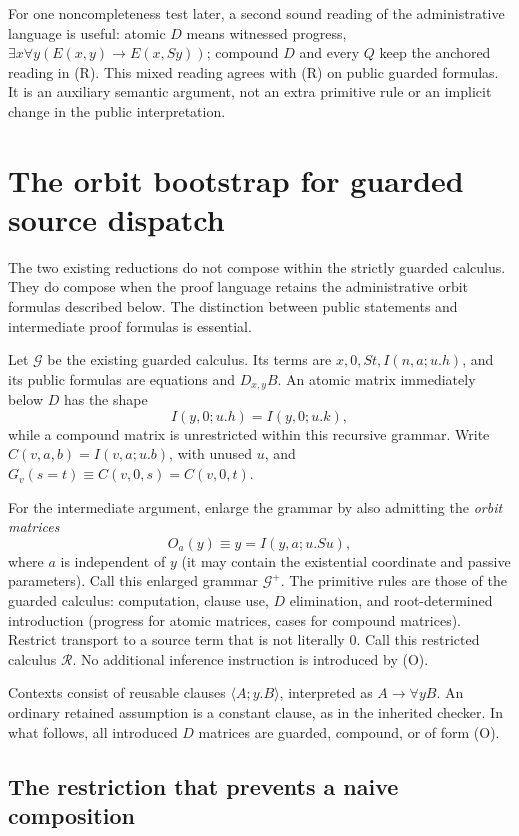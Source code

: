 \documentclass[11pt,letterpaper]{article}
\theoremstyle{definition}\newtheorem{definition}[theorem]{Definition}
\theoremstyle{remark}\newtheorem{remark}[theorem]{Remark}
\begin{document}
For one noncompleteness test later, a second sound reading of the
administrative language is useful: atomic $D$ means witnessed progress,
$\exists x\forall y(E(x,y)\to E(x,Sy))$; compound $D$ and every $Q$
keep the anchored reading in (R). This mixed reading agrees with (R) on
public guarded formulas. It is an auxiliary semantic argument, not an
extra primitive rule or an implicit change in the public interpretation.

\section{The orbit bootstrap for guarded source dispatch}

The two existing reductions do not compose within the strictly guarded
calculus. They do compose when the proof language retains the administrative
orbit formulas described below. The distinction between public statements
and intermediate proof formulas is essential.

Let $\mathcal G$ be the existing guarded calculus. Its terms are
$x,0,St,I(n,a;u.h)$, and its public formulas are equations and
$D_{x,y}B$. An atomic matrix immediately below $D$ has the shape
\[
  I(y,0;u.h)=I(y,0;u.k),
\]
while a compound matrix is unrestricted within this recursive grammar.
Write $C(v,a,b)=I(v,a;u.b)$, with unused $u$, and
$G_v(s=t)\equiv C(v,0,s)=C(v,0,t)$.

For the intermediate argument, enlarge the grammar by also admitting the
\emph{orbit matrices}
\[
       O_a(y)\equiv y=I(y,a;u.Su),             \tag{O}
\]
where $a$ is independent of $y$ (it may contain the existential coordinate
and passive parameters). Call this enlarged grammar $\mathcal G^+$.
The primitive rules are those of the guarded calculus: computation, clause
use, $D$ elimination, and root-determined introduction (progress for atomic
matrices, cases for compound matrices). Restrict transport to a source term
that is not literally $0$. Call this restricted calculus $\mathcal R$.
No additional inference instruction is introduced by (O).

Contexts consist of reusable clauses $\langle A;y.B\rangle$, interpreted
as $A\to\forall yB$. An ordinary retained assumption is a constant clause,
as in the inherited checker. In what follows, all introduced $D$ matrices
are guarded, compound, or of form (O).

\subsection{The restriction that prevents a naive composition}
\end{document}
